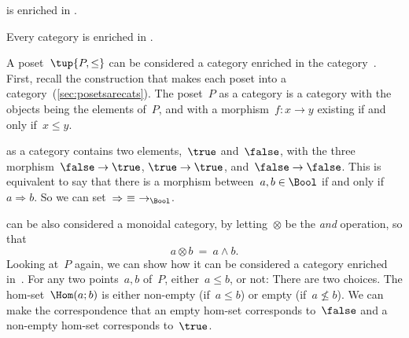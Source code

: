 {    \begin{example}
        \Category is enriched in \Category.
    \end{example}

    \begin{example}
        Every category is enriched in \Set.
    \end{example}

    \begin{example}
        A poset~$\tup{P, \leq}$ can be considered a category enriched in the category~\Bool.
        First, recall the construction that makes each poset into a category~(\cref{sec:posetsarecats}).
        The poset~$P$ as a category is a category with the objects being the elements of~$P$, and with a morphism~$f\colon x \to y$ existing if and only if~$x\leq y$.

        \Bool as a category contains two elements,~$\true$ and~$\false$, with
        the three morphism~$\false \to \true$, $\true \to \true$, and~$\false \to \false$.
        This is equivalent to say that there is a morphism between~$a, b \in \Bool$ if and only if~$a \Rightarrow b$.
        So we can set~$\Rightarrow\ \equiv\ \to_{\Bool}$.

        \Bool can be also considered a monoidal category, by letting~$\otimes$ be
        the \emph{and} operation, so that
        \begin{equation}
            a \otimes b\ =\ a \wedge b.
        \end{equation}
        Looking at~$P$ again, we can show how it can be considered a category enriched in~\Bool.
        For any two points~$a, b$ of~$P$, either~$a \leq b$, or not: There are two choices.
        The hom-set~$\Hom(a; b)$ is either non-empty (if~$a \leq b$) or empty (if~$a \not\leq b$).
        We can make the correspondence that an empty hom-set corresponds to~$\false$ and a non-empty hom-set corresponds to~$\true$.


\end{example}}
